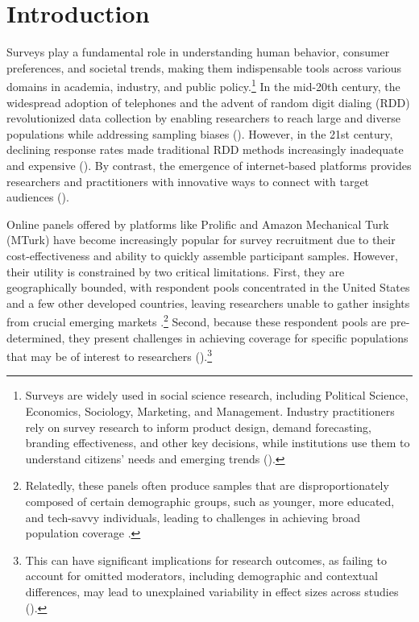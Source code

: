 \section{Introduction}
Surveys play a fundamental role in understanding human behavior, consumer preferences, and societal trends, making them indispensable tools across various domains in academia, industry, and public policy.\footnote{Surveys are widely used in social science research, including Political Science, Economics, Sociology, Marketing, and Management. Industry practitioners rely on survey research to inform product design, demand forecasting, branding effectiveness, and other key decisions, while institutions use them to understand citizens' needs and emerging trends (\citealt{rossi2013handbook, vannette2017palgrave}).} In the mid-20th century, the widespread adoption of telephones and the advent of random digit dialing (RDD) revolutionized data collection by enabling researchers to reach large and diverse populations while addressing sampling biases (\citealt{Cooper1964,Glasser1972,sudman1973uses}). However, in the 21st century, declining response rates made traditional RDD methods increasingly inadequate and expensive (\citealt{keeter2017low}). By contrast, the emergence of internet-based platforms provides researchers and practitioners with innovative ways to connect with target audiences (\citealt{yeager2011comparing}). 


Online panels offered by platforms like Prolific and Amazon Mechanical Turk (MTurk) have become increasingly popular for survey recruitment due to their cost-effectiveness and ability to quickly assemble participant samples. However, their utility is constrained by two critical limitations. First, they are geographically bounded, with respondent pools concentrated in the United States and a few other developed countries, leaving researchers unable to gather insights from crucial emerging markets \citep{narasimhan2015marketing}.\footnote{Relatedly, these panels often produce samples that are disproportionately composed of certain demographic groups, such as younger, more educated, and tech-savvy individuals, leading to challenges in achieving broad population coverage \citep{stewart2015average}.} Second, because these respondent pools are pre-determined, they present challenges in achieving coverage for specific populations that may be of interest to researchers (\citealt{peer2017beyond}).\footnote{This can have significant implications for research outcomes, as failing to account for omitted moderators, including demographic and contextual differences, may lead to unexplained variability in effect sizes across studies (\citealt{krefeld2024exposing}).}

